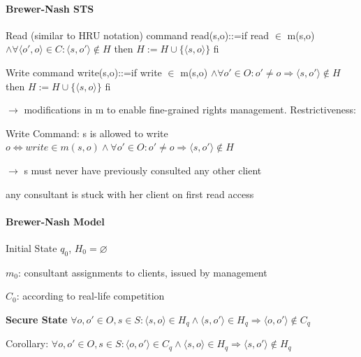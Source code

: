 \documentclass[a4paper]{article}
\renewcommand{\note}[2]{\begin{noteBox} \textbf{#1} #2 \end{noteBox}}
\begin{document}
\begin{multicols}{3}
    \paragraph{Brewer-Nash STS}
    \begin{itemize*}
        \item Read (similar to HRU notation)
        command read(s,o)::=if read $\in$ m(s,o) $\wedge\forall \langle o',o\rangle \in C:\langle s,o'\rangle \not\in H$
        then
        $H:=H\cup\{\langle s,o\rangle \}$
        fi
        \item Write
        command write(s,o)::=if write $\in$ m(s,o) $\wedge\forall o'\in O:o'\not=o \Rightarrow \langle s,o'\rangle \not\in H$
        then
        $H:=H\cup\{\langle s,o\rangle \}$
        fi
    \end{itemize*}

    $\rightarrow$ modifications in m to enable fine-grained rights management.
    Restrictiveness:
    \begin{itemize*}
        \item Write Command: s is allowed to write $o\Leftrightarrow write\in m(s,o)\wedge\forall o'\in O:o'\not=o\Rightarrow\langle s,o'\rangle \not\in H$
        \item[$\rightarrow$] s must never have previously consulted any other client
        \item any consultant is stuck with her client on first read access
    \end{itemize*}

    \paragraph{Brewer-Nash Model}
    \begin{itemize*}
        \item Initial State $q_0$, $H_0 =\varnothing$
        \item $m_0$: consultant assignments to clients, issued by management
        \item $C_0$: according to real-life competition
    \end{itemize*}

    \note{Secure State}{$\forall o,o' \in O,s\in S:\langle s,o\rangle \in H_q\wedge\langle s,o'\rangle \in H_q\Rightarrow\langle o,o'\rangle \not\in C_q$

        Corollary: $\forall o,o'\in O,s\in S:\langle o,o'\rangle \in C_q\wedge\langle s,o\rangle \in H_q\Rightarrow \langle s,o'\rangle \not\in H_q$
    }


\end{multicols}
\end{document}
